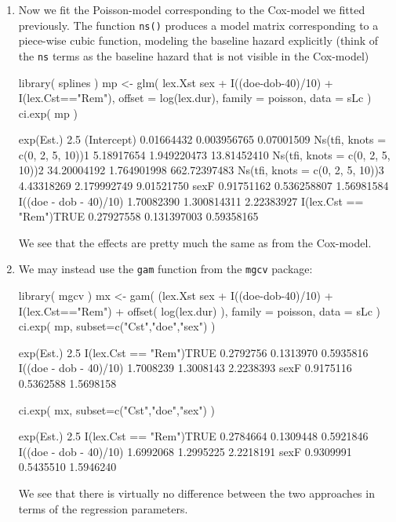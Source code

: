 \begin{enumerate}[resume]
\item Now we fit the Poisson-model corresponding to the Cox-model
  we fitted previously. The function \texttt{ns()} produces a model
  matrix corresponding to a piece-wise cubic function, modeling the
  baseline hazard explicitly (think of the \texttt{ns} terms as the
  baseline hazard that is not visible in the Cox-model)
\begin{Schunk}
\begin{Sinput}
 library( splines )
 mp <- glm( lex.Xst %in% EP ~ Ns( tfi, knots=c(0,2,5,10) ) +
            sex + I((doe-dob-40)/10) + I(lex.Cst=="Rem"),
            offset = log(lex.dur),
            family = poisson, 
              data = sLc )
 ci.exp( mp )
\end{Sinput}
\begin{Soutput}
                                   exp(Est.)        2.5%        97.5%
(Intercept)                       0.01664432 0.003956765   0.07001509
Ns(tfi, knots = c(0, 2, 5, 10))1  5.18917654 1.949220473  13.81452410
Ns(tfi, knots = c(0, 2, 5, 10))2 34.20004192 1.764901998 662.72397483
Ns(tfi, knots = c(0, 2, 5, 10))3  4.43318269 2.179992749   9.01521750
sexF                              0.91751162 0.536258807   1.56981584
I((doe - dob - 40)/10)            1.70082390 1.300814311   2.22383927
I(lex.Cst == "Rem")TRUE           0.27927558 0.131397003   0.59358165
\end{Soutput}
\end{Schunk}
We see that the effects are pretty much the same as from the
Cox-model.


\item We may instead use the \texttt{gam} function from the
  \texttt{mgcv} package:
\begin{Schunk}
\begin{Sinput}
 library( mgcv )
 mx <- gam( (lex.Xst %in% EP) ~ s( tfi, k=10 ) +
            sex + I((doe-dob-40)/10) + I(lex.Cst=="Rem") +
            offset( log(lex.dur) ),
            family = poisson, 
              data = sLc )
 ci.exp( mp, subset=c("Cst","doe","sex") )
\end{Sinput}
\begin{Soutput}
                        exp(Est.)      2.5%     97.5%
I(lex.Cst == "Rem")TRUE 0.2792756 0.1313970 0.5935816
I((doe - dob - 40)/10)  1.7008239 1.3008143 2.2238393
sexF                    0.9175116 0.5362588 1.5698158
\end{Soutput}
\begin{Sinput}
 ci.exp( mx, subset=c("Cst","doe","sex") )
\end{Sinput}
\begin{Soutput}
                        exp(Est.)      2.5%     97.5%
I(lex.Cst == "Rem")TRUE 0.2784664 0.1309448 0.5921846
I((doe - dob - 40)/10)  1.6992068 1.2995225 2.2218191
sexF                    0.9309991 0.5435510 1.5946240
\end{Soutput}
\end{Schunk}
We see that there is virtually no difference between the two
approaches in terms of the regression parameters.



\end{enumerate}
